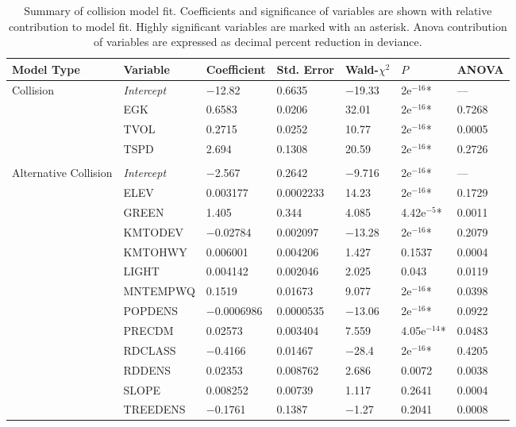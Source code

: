 \begin{table}[htp]
\caption[Summary of collision and alternative collision models]{Summary of collision model fit. Coefficients and significance of variables are shown with relative contribution to model fit. Highly significant variables are marked with an asterisk. Anova contribution of variables are expressed as decimal percent reduction in deviance.}
\centering
\begin{tabularx}{0.9\textwidth}{lllllll} \toprule
Model Type &Variable         &Coefficient &Std. Error			&Wald-{\large$\chi$}$^2$ &{\normalsize$P$} &ANOVA\\ \midrule 
Collision  				&\emph{Intercept}	& $-$12.82			& 0.6635   	& $-$19.33	&\TL 2e$^{-16}$*	& --- \\
           				& EGK				& 0.6583			& 0.0206   	& 32.01		&\TL 2e$^{-16}$*	& 0.7268 \\
           				& TVOL				& 0.2715			& 0.0252   	& 10.77		&\TL 2e$^{-16}$*	& 0.0005 \\
           				& TSPD				& 2.694				& 0.1308   	& 20.59		&\TL 2e$^{-16}$*	& 0.2726 \\
           				&                  	&                 	&         	&         	&       	& \\
Alternative Collision	& \emph{Intercept} 	& $-$2.567 			& 0.2642	& $-$9.716 	&\TL 2e$^{-16}$*	& --- \\ 
   						& ELEV				& 0.003177			& 0.0002233	& 14.23 	&\TL 2e$^{-16}$*	& 0.1729 \\ 
   						& GREEN				& 1.405				& 0.344 	& 4.085		& 4.42e$^{-5}$*	& 0.0011 \\ 
   						& KMTODEV			& $-$0.02784			& 0.002097 	& $-$13.28 	&\TL 2e$^{-16}$*	& 0.2079 \\ 
   						& KMTOHWY			& 0.006001			& 0.004206 	& 1.427 	& 0.1537 	& 0.0004 \\ 
   						& LIGHT				& 0.004142			& 0.002046 	& 2.025 	& 0.043 	& 0.0119 \\ 
   						& MNTEMPWQ			& 0.1519			& 0.01673 	& 9.077 	&\TL 2e$^{-16}$*	& 0.0398 \\ 
   						& POPDENS			& $-$0.0006986		& 0.0000535	& $-$13.06 	&\TL 2e$^{-16}$*	& 0.0922 \\ 
   						& PRECDM			& 0.02573			& 0.003404 	& 7.559 	& 4.05e$^{-14}$*	& 0.0483 \\ 
   						& RDCLASS			& $-$0.4166			& 0.01467 	& $-$28.4 	&\TL 2e$^{-16}$*	& 0.4205 \\ 
   						& RDDENS			& 0.02353			& 0.008762 	& 2.686 	& 0.0072 	& 0.0038 \\ 
   						& SLOPE				& 0.008252			& 0.00739 	& 1.117 	& 0.2641	& 0.0004 \\ 
   						& TREEDENS			& $-$0.1761			& 0.1387 	& $-$1.27 	& 0.2041	& 0.0008 \\ 
\bottomrule
\end{tabularx}
\label{egk_sum_coll}
\end{table}

